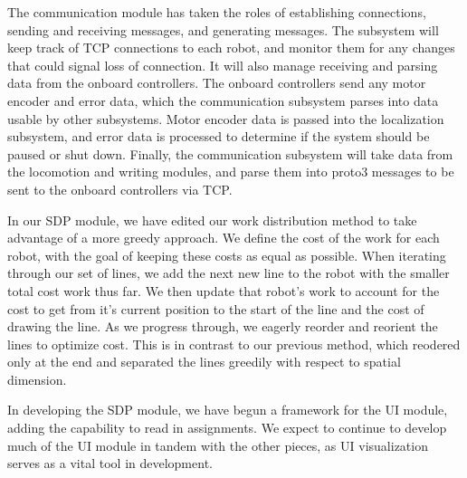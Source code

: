 The communication module has taken the roles of establishing connections, sending and receiving messages, and generating messages. The subsystem will keep track of TCP connections to each robot, and monitor them for any changes that could signal loss of connection. It will also manage receiving and parsing data from the onboard controllers. The onboard controllers send any motor encoder and error data, which the communication subsystem parses into data usable by other subsystems. Motor encoder data is passed into the localization subsystem, and error data is processed to determine if the system should be paused or shut down. Finally, the communication subsystem will take data from the locomotion and writing modules, and parse them into proto3 messages to be sent to the onboard controllers via TCP.

In our SDP module, we have edited our work distribution method to take advantage of a more greedy approach. We define the cost of the work for each robot, with the goal of keeping these costs as equal as possible. When iterating through our set of lines, we add the next new line to the robot with the smaller total cost work thus far. We then update that robot's work to account for the cost to get from it's current position to the start of the line and the cost of drawing the line. As we progress through, we eagerly reorder and reorient the lines to optimize cost. This is in contrast to our previous method, which reodered only at the end and separated the lines greedily with respect to spatial dimension.

In developing the SDP module, we have begun a framework for the UI module, adding the capability to read in assignments. We expect to continue to develop much of the UI module in tandem with the other pieces, as UI visualization serves as a vital tool in development.
